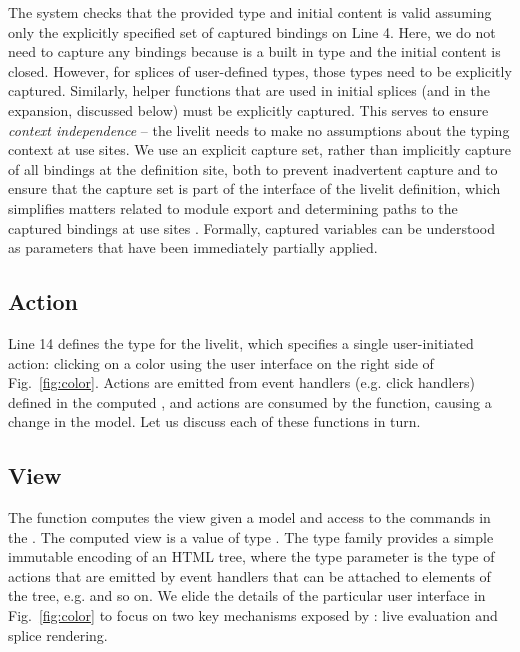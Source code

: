 The system checks that the provided type and initial content is valid 
assuming only the explicitly specified set of captured bindings on Line 4.
Here, we do not need to capture any bindings because  is a built in type
and the initial content is closed. However, 
for splices of user-defined types, those types need to be explicitly captured.
Similarly, helper functions that are used in initial splices (and in the expansion,
discussed below) must be explicitly captured. 
This serves to ensure \emph{context independence} -- the livelit needs to make no 
assumptions about the typing context at use sites.
We use an explicit capture set, rather than implicitly capture of all bindings at the definition site, 
both to prevent inadvertent capture 
and to ensure that the capture set is part
of the interface of the livelit definition, which simplifies matters related to 
module export and determining paths to the captured bindings at use sites \cite{TLMs}.
Formally, captured variables can be understood as parameters that have been 
immediately partially applied.

\subsection{Action}
Line 14 defines the  type for the  livelit, which 
specifies a single user-initiated action: clicking on a color using the user 
interface on the right side of Fig.~\ref{fig:color}. Actions are emitted
from event handlers (e.g. click handlers) defined in the computed , 
and actions are consumed by the  function, causing a change in the model. 
Let us discuss each of these functions in turn.

\subsection{View}
The  function computes the view given a model and access to the commands in 
the . The computed view is a value of type .  
The type family  provides a simple immutable
encoding of an HTML tree, where the type parameter  is the type of actions that 
are emitted by event handlers that can be attached to elements of the tree, e.g.
 and so on. 
We elide the details of the particular user interface in Fig.~\ref{fig:color}
to focus on two key mechanisms exposed by : live evaluation 
and splice rendering.

